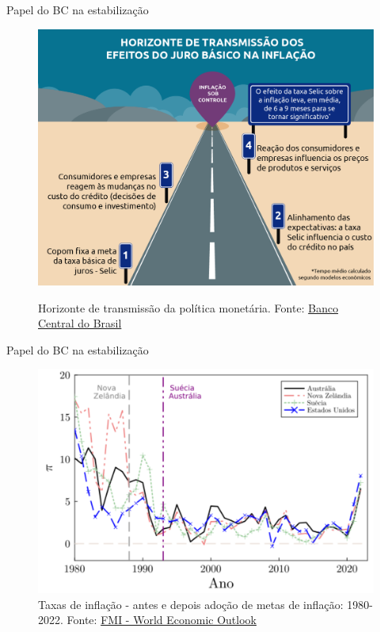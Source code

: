 \documentclass[10pt]{beamer}
\begin{document}
\begin{frame}
    {Papel do BC na estabilização}
    \begin{figure}
        \href{https://www.bcb.gov.br/content/controleinflacao/Infograficos_controleinflacao/Info-Controle-politicamonetariaeomeubolso-v2.png}{\includegraphics[width=.6\textwidth]{./figures/aula15_fig5.png}}
        \caption{Horizonte de transmissão da política monetária. Fonte: \href{https://www.bcb.gov.br/content/controleinflacao/Infograficos_controleinflacao/Info-Controle-politicamonetariaeomeubolso-v2.png}{Banco Central do Brasil}}
    \end{figure}
\end{frame}

\begin{frame}
    {Papel do BC na estabilização}
    \begin{figure}
        \includegraphics[width=.6\textwidth]{./figures/aula15_fig6.PNG}
        \caption{Taxas de inflação - antes e depois adoção de metas de inflação: 1980-2022. Fonte: \href{https://www.imf.org/en/Publications/SPROLLS/world-economic-outlook-databases\#sort=\%40imfdate\%20descending}{FMI - World Economic Outlook}}
    \end{figure}
\end{frame}
\end{document}
